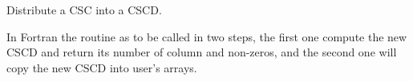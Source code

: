          {
Distribute a CSC into a CSCD.

In Fortran the routine as to be called in two steps, the first one
compute the new CSCD and return its number of column and non-zeros,
and the second one will copy the new CSCD into user's arrays. 
}
